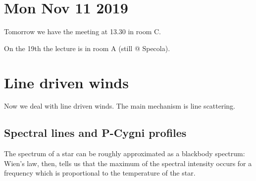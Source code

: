 \documentclass[main.tex]{subfiles}
\begin{document}
\section*{Mon Nov 11 2019}

Tomorrow we have the meeting at 13.30 in room C.

On the 19th the lecture is in room A (still @ Specola).

\section{Line driven winds}

Now we deal with line driven winds.
The main mechanism is line scattering.

\subsection{Spectral lines and P-Cygni profiles}

The spectrum of a star can be roughly approximated as a blackbody spectrum: Wien's law, then, tells us that the maximum of the spectral intensity occurs for a frequency which is proportional to the temperature of the star.
\end{document}
